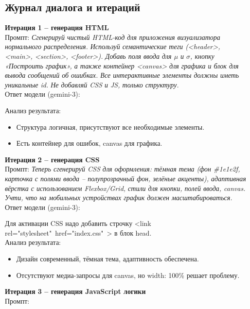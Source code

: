 \subsection{Журнал диалога и итераций}
\noindent
\textbf{Итерация 1 – генерация HTML} \\
\indent
Промпт:
\textit{Сгенерируй чистый HTML-код для приложения визуализатора нормального распределения. Используй семантические теги (<header>, <main>, <section>, <footer>). Добавь поля ввода для $\mu$ и $\sigma$, кнопку «Построить график», а также контейнер <canvas> для графика и блок для вывода сообщений об ошибках. Все интерактивные элементы должны иметь уникальные id. Не добавляй CSS и JS, только структуру.} \\
\newline
\noindent
Ответ модели (gemini-3):

Анализ результата:
\begin{itemize}
	\item Структура логичная, присутствуют все необходимые элементы.
	\item Есть контейнер для ошибок, canvas для графика.
\end{itemize}
\noindent
\textbf{Итерация 2 – генерация CSS} \\
\indent
Промпт:
\textit{Теперь сгенерируй CSS для оформления: тёмная тема (фон \#1e1e2f, карточка с полями ввода – полупрозрачный фон, зелёные акценты), адаптивная вёрстка с использованием Flexbox/Grid, стили для кнопки, полей ввода, canvas. Учти, что на мобильных устройствах график должен масштабироваться.} \\
\newline
Ответ модели (gemini-3):

Для активации CSS надо добавить строчку <link rel="stylesheet"\ href="index.css"\ > в блок head. \\
\newline
\noindent
Анализ результата:
\begin{itemize}
	\item Дизайн современный, тёмная тема, адаптивность обеспечена.
	\item Отсутствуют медиа-запросы для canvas, но width: 100\% решает проблему.
\end{itemize}
\noindent
\textbf{Итерация 3 – генерация JavaScript логики} \\
\indent
Промпт:
